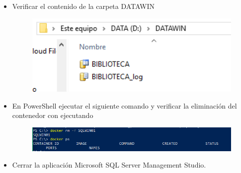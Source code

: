 \begin{itemize}
          \item Verificar el contenido de la carpeta DATAWIN
		\begin{figure}[H]
		\begin{center}
		\includegraphics[width=12cm]{./Imagenes/c8}
		\end{center}
		\end{figure}  
         \item En PowerShell ejecutar el siguiente comando y verificar la eliminación del contenedor con ejecutando
		\begin{figure}[H]
		\begin{center}
		\includegraphics[width=15cm]{./Imagenes/c9}
		\end{center}
		\end{figure}  
          \item Cerrar la aplicación Microsoft SQL Server Management Studio.
       
\end{itemize}
		